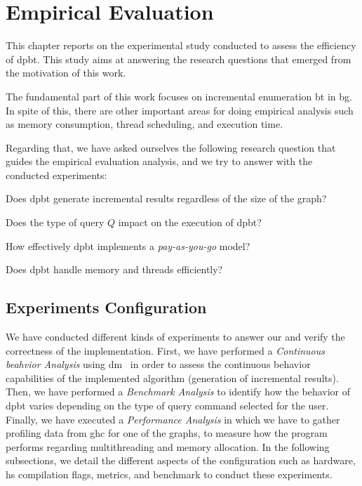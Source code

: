 \chapter{Empirical Evaluation}\label{experiments}
This chapter reports on the experimental study conducted to assess the efficiency of \acrshort{dpbt}. This study aims at answering the research questions that emerged from the motivation of this work. 

The fundamental part of this work focuses on incremental enumeration \acrshort{bt} in \acrshort{bg}. 
In spite of this, there are other important areas for doing empirical analysis such as memory consumption, thread scheduling, and execution time.

Regarding that, we have asked ourselves the following research question that guides the empirical evaluation analysis, and we try to answer with the conducted experiments:
\begin{inparaenum}[\bf {\bf RQ}1\upshape)]
\label{res:bt:question}
    \item Does \acrshort{dpbt} generate incremental results regardless of the size of the graph?
    \item Does the type of query $Q$ impact on the execution of \acrshort{dpbt}?
    \item How effectively \acrshort{dpbt} implements a \emph{pay-as-you-go} model?
    \item Does \acrshort{dpbt} handle memory and threads efficiently?
\end{inparaenum}
  
\section{Experiments Configuration}
We have conducted different kinds of experiments to answer our  and verify the correctness of the implementation.
First, we have performed a \emph{Continuous beahvior Analysis} using \acrfull{dm}~\cite{diefpaper} in order to assess the continuous behavior capabilities of the implemented algorithm (generation of incremental results). 
Then, we have performed a \emph{Benchmark Analysis} to identify how the behavior of \acrshort{dpbt} varies depending on the type of query command selected for the user.
Finally, we have executed a \textit{Performance Analysis} in which we have to gather profiling data from \acrfull{ghc} for one of the graphs, 
to measure how the program performs regarding multithreading and memory allocation.
In the following subsections, we detail the different aspects of the configuration such as hardware, \acrshort{hs} compilation flags, metrics, and benchmark to conduct these experiments.


